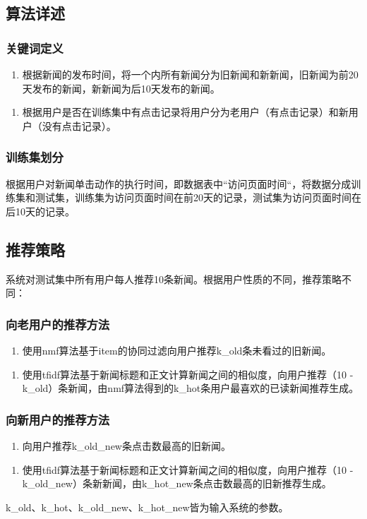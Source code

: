 \documentclass[UTF8]{article}
\begin{document}
\subsection{算法详述}
\subsubsection{关键词定义}
\begin{enumerate}{(1)}
	\item 根据新闻的发布时间，将一个内所有新闻分为旧新闻和新新闻，旧新闻为前20天发布的新闻，新新闻为后10天发布的新闻。
\end{enumerate}
\begin{enumerate}{(2)}
	\item 根据用户是否在训练集中有点击记录将用户分为老用户（有点击记录）和新用户（没有点击记录）。
\end{enumerate}
\subsubsection{训练集划分}
根据用户对新闻单击动作的执行时间，即数据表中“访问页面时间“，将数据分成训练集和测试集，训练集为访问页面时间在前20天的记录，测试集为访问页面时间在后10天的记录。
\subsection{推荐策略}
系统对测试集中所有用户每人推荐10条新闻。根据用户性质的不同，推荐策略不同：
\subsubsection{向老用户的推荐方法}
\begin{enumerate}{(1)}
	\item 使用nmf算法基于item的协同过滤向用户推荐k\_old条未看过的旧新闻。
\end{enumerate}
\begin{enumerate}{(2)}
	\item 使用tfidf算法基于新闻标题和正文计算新闻之间的相似度，向用户推荐（10 - k\_old）条新闻，由nmf算法得到的k\_hot条用户最喜欢的已读新闻推荐生成。
\end{enumerate}
\subsubsection{向新用户的推荐方法}
\begin{enumerate}{(1)}
	\item 向用户推荐k\_old\_new条点击数最高的旧新闻。
\end{enumerate}
\begin{enumerate}{(2)}
	\item 使用tfidf算法基于新闻标题和正文计算新闻之间的相似度，向用户推荐（10 - k\_old\_new）条新新闻，由k\_hot\_new条点击数最高的旧新推荐生成。
\end{enumerate}
k\_old、k\_hot、k\_old\_new、k\_hot\_new皆为输入系统的参数。
\end{document}
